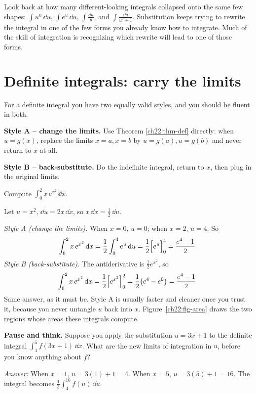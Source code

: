 \begin{aestheticbox}
Look back at how many different-looking integrals collapsed onto the same few
shapes: $\int u^n\,\dd u$, $\int e^u\,\dd u$, $\int \frac{\dd u}{u}$, and $\int
\frac{\dd u}{u^2+1}$. Substitution keeps trying to rewrite the integral in one of
the few forms you already know how to integrate. Much of the skill of integration is
recognizing which rewrite will lead to one of those forms.
\end{aestheticbox}

\section{Definite integrals: carry the limits}
\label{ch22:definite}

For a definite integral you have two equally valid styles, and you should be fluent
in both.

\textbf{Style A -- change the limits.} Use Theorem \ref{ch22:thm-def} directly:
when $u = g(x)$, replace the limits $x=a, x=b$ by $u=g(a), u=g(b)$ and never return
to $x$ at all.

\textbf{Style B -- back-substitute.} Do the indefinite integral, return to $x$,
then plug in the original limits.

\begin{example}
\label{ch22:ex-bothways}
Compute $\displaystyle \int_0^2 x\,e^{x^2}\,\dd x$.

Let $u = x^2$, $\dd u = 2x\,\dd x$, so $x\,\dd x = \tfrac12\,\dd u$.

\emph{Style A (change the limits).} When $x=0$, $u=0$; when $x=2$, $u=4$. So
\[
  \int_0^2 x\,e^{x^2}\,\mathrm{d} x = \frac12\int_{0}^{4} e^u\,\mathrm{d} u
   = \frac12\Big[e^u\Big]_{0}^{4} = \frac{e^4-1}{2}.
\]
\emph{Style B (back-substitute).} The antiderivative is $\tfrac12 e^{x^2}$, so
\[
  \int_0^2 x\,e^{x^2}\,\mathrm{d} x = \frac12\Big[e^{x^2}\Big]_{0}^{2}
   = \frac12\big(e^4 - e^0\big) = \frac{e^4-1}{2}.
\]
Same answer, as it must be. Style A is usually faster and cleaner once you trust it,
because you never untangle $u$ back into $x$. Figure~\ref{ch22:fig-area} draws the
two regions whose areas these integrals compute.
\end{example}

\begin{recoverybox}
\textbf{Pause and think.} Suppose you apply the substitution $u = 3x+1$ to the definite integral $\int_1^5 f(3x+1)\,\dd x$. What are the new limits of integration in $u$, before you know anything about $f$?

\emph{Answer:} When $x = 1$, $u = 3(1)+1 = 4$. When $x = 5$, $u = 3(5)+1 = 16$. The integral becomes $\frac{1}{3}\int_4^{16} f(u)\,\dd u$.
\end{recoverybox}

